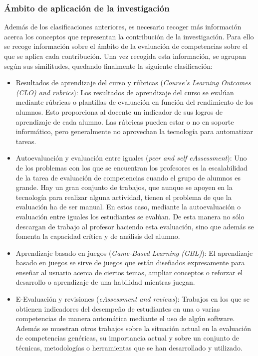 \subsubsection{Ámbito de aplicación de la investigación}
Además de los clasificaciones anteriores, es necesario recoger más información acerca los conceptos que representan la contribución de la investigación. Para ello se recoge información sobre el ámbito de la evaluación de competencias sobre el que se aplica cada contribución. Una vez recogida esta información, se agrupan según sus similitudes, quedando finalmente la siguiente clasificación:
\begin{itemize}
\item Resultados de aprendizaje del curso y rúbricas (\emph{Course’s Learning Outcomes (CLO) and rubrics}): Los resultados de aprendizaje del curso se evalúan mediante rúbricas o plantillas de evaluación en función del rendimiento de los alumnos. Esto proporciona al docente un indicador de sus logros de aprendizaje de cada alumno. Las rúbricas pueden estar o no en soporte informático, pero generalmente no aprovechan la tecnología para automatizar tareas.
\item Autoevaluación y evaluación entre iguales (\emph{peer and self eAssessment}): Uno de los problemas con los que se encuentran los profesores es la escalabilidad de la tarea de evaluación de competencias cuando el grupo de alumnos es grande. Hay un gran conjunto de trabajos, que aunque se apoyen en la tecnología para realizar alguna actividad, tienen el problema de que la evaluación ha de ser manual. En estos caso, mediante la autoevaluación o evaluación entre iguales los estudiantes se evalúan. De esta manera no sólo descargan de trabajo al profesor haciendo esta evaluación, sino que además se fomenta la capacidad crítica y de análisis del alumno.
\item Aprendizaje basado en juegos (\emph{Game-Based Learning (GBL)}): El aprendizaje basado en juegos se sirve de juegos que están diseñados expresamente para enseñar al usuario acerca de ciertos temas, ampliar conceptos o reforzar el desarrollo o aprendizaje de una habilidad mientras juegan.
\item E-Evaluación y revisiones (\emph{eAssessment and reviews}): Trabajos en los que se obtienen indicadores del desempeño de estudiantes en una o varias competencias de manera automática mediante el uso de algún software. Además se muestran otros trabajos sobre la situación actual en la evaluación de competencias genéricas, su importancia actual y sobre un conjunto de técnicas, metodologías o herramientas que se han desarrollado y utilizado.
\end{itemize}

